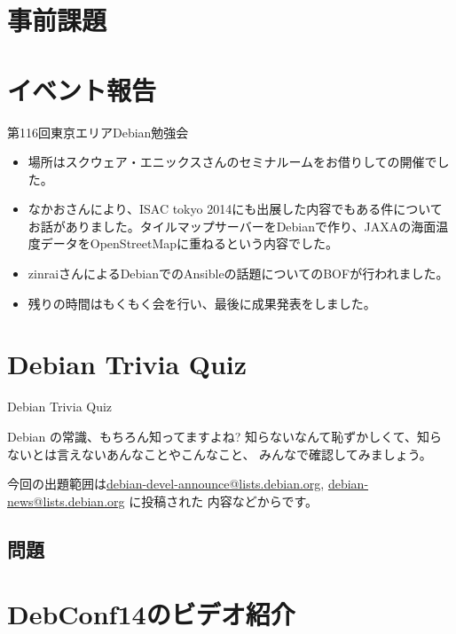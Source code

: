 \section{事前課題}
{\footnotesize

}

\section{イベント報告}

\begin{frame}{第116回東京エリアDebian勉強会}
 
\begin{itemize}
\item 場所はスクウェア・エニックスさんのセミナルームをお借りしての開催でした。
\item なかおさんにより、ISAC tokyo 2014にも出展した内容でもある件についてお話がありました。タイルマップサーバーをDebianで作り、JAXAの海面温度データをOpenStreetMapに重ねるという内容でした。
\item zinraiさんによるDebianでのAnsibleの話題についてのBOFが行われました。
\item 残りの時間はもくもく会を行い、最後に成果発表をしました。
\end{itemize} 

\end{frame}

\section{Debian Trivia Quiz}
\begin{frame}{Debian Trivia Quiz}

  Debian の常識、もちろん知ってますよね?
知らないなんて恥ずかしくて、知らないとは言えないあんなことやこんなこと、
みんなで確認してみましょう。

今回の出題範囲は\url{debian-devel-announce@lists.debian.org},
\url{debian-news@lists.debian.org} に投稿された
内容などからです。

\end{frame}

\subsection{問題}



\section{DebConf14のビデオ紹介}


